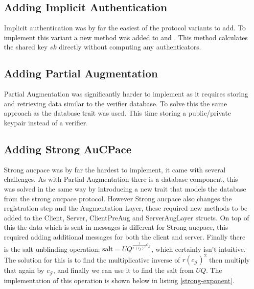 \subsection{Adding Implicit Authentication}
Implicit authentication was by far the easiest of the protocol variants to add.
To implement this variant a new method  was added to  and .
This method calculates the shared key $sk$ directly without computing any authenticators.

\subsection{Adding Partial Augmentation}
Partial Augmentation was significantly harder to implement as it requires storing and retrieving data similar to the verifier database.
To solve this the same approach as the database trait was used.
This time storing a public/private keypair instead of a verifier.

\subsection{Adding Strong AuCPace}
Strong \gls{aucpace} was by far the hardest to implement, it came with several challenges.
As with Partial Augmentation there is a database component, this was solved in the same way by introducing a new trait that models the database from the strong \gls{aucpace} protocol.
However Strong \gls{aucpace} also changes the registration step and the Augmentation Layer, these required new methods to be added to the Client, Server, ClientPreAug and ServerAugLayer structs.
On top of this the data which is sent in messages is different for Strong \gls{aucpace}, this required adding additional messages for both the client and server.
Finally there is the salt unblinding operation: $\text{salt} = UQ^{\frac{1}{r\ (c_{\mathcal{J}})^2} c_{\mathcal{J}}}$, which certainly isn't intuitive.
The solution for this is to find the multiplicative inverse of $r (c_{\mathcal{J}})^2$ then multiply that again by $c_{\mathcal{J}}$, and finally we can use it to find the salt from $UQ$.
The implementation of this operation is shown below in listing \ref{strong-exponent}.


